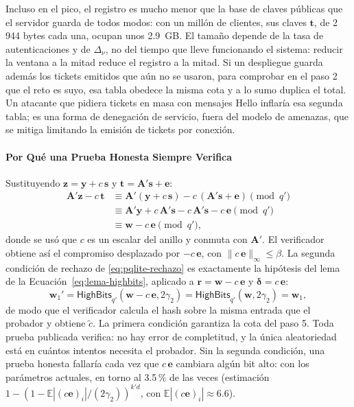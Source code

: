Incluso en el pico, el registro es mucho menor que la base de claves públicas que el servidor guarda de todos modos: con un millón de clientes, sus claves $\mathbf{t}$, de 2\,944 bytes cada una, ocupan unos 2.9~GB. El tamaño depende de la tasa de autenticaciones y de $\Delta_\nu$, no del tiempo que lleve funcionando el sistema: reducir la ventana a la mitad reduce el registro a la mitad. Si un despliegue guarda además los tickets emitidos que aún no se usaron, para comprobar en el paso 2 que el reto es suyo, esa tabla obedece la misma cota y a lo sumo duplica el total. Un atacante que pidiera tickets en masa con mensajes \textsf{Hello} inflaría esa segunda tabla; es una forma de denegación de servicio, fuera del modelo de amenazas, que se mitiga limitando la emisión de tickets por conexión.

\paragraph{Por Qué una Prueba Honesta Siempre Verifica}
Sustituyendo $\mathbf{z} = \mathbf{y} + c\,\mathbf{s}$ y $\mathbf{t} = \mathbf{A}'\mathbf{s} + \mathbf{e}$:
\begin{align}
\mathbf{A}'\mathbf{z} - c\,\mathbf{t} &\equiv \mathbf{A}'(\mathbf{y} + c\,\mathbf{s}) - c\,(\mathbf{A}'\mathbf{s} + \mathbf{e}) \pmod{q'} \nonumber \\
&\equiv \mathbf{A}'\mathbf{y} + c\,\mathbf{A}'\mathbf{s} - c\,\mathbf{A}'\mathbf{s} - c\,\mathbf{e} \pmod{q'} \nonumber \\
&\equiv \mathbf{w} - c\,\mathbf{e} \pmod{q'},
\end{align}
donde se usó que $c$ es un escalar del anillo y conmuta con $\mathbf{A}'$. El verificador obtiene así el compromiso desplazado por $-c\,\mathbf{e}$, con $\|c\,\mathbf{e}\|_\infty \le \beta$. La segunda condición de rechazo de \eqref{eq:pqlite-rechazo} es exactamente la hipótesis del lema de la Ecuación~\eqref{eq:lema-highbits}, aplicado a $\mathbf{r} = \mathbf{w} - c\,\mathbf{e}$ y $\boldsymbol{\delta} = c\,\mathbf{e}$:
\begin{equation}
\mathbf{w}_1' = \mathsf{HighBits}_{q'}(\mathbf{w} - c\,\mathbf{e}, 2\gamma_2) = \mathsf{HighBits}_{q'}(\mathbf{w}, 2\gamma_2) = \mathbf{w}_1,
\end{equation}
de modo que el verificador calcula el hash sobre la misma entrada que el probador y obtiene $\tilde{c}$. La primera condición garantiza la cota del paso 5. Toda prueba publicada verifica: no hay error de completitud, y la única aleatoriedad está en cuántos intentos necesita el probador. Sin la segunda condición, una prueba honesta fallaría cada vez que $c\,\mathbf{e}$ cambiara algún bit alto: con los parámetros actuales, en torno al 3.5\,\% de las veces (estimación $1 - (1 - \mathbb{E}|(c\mathbf{e})_i| / (2\gamma_2))^{k'd}$, con $\mathbb{E}|(c\mathbf{e})_i| \approx 6.6$).

